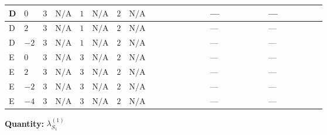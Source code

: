 \documentclass[8pt]{article}
\begin{document}
\begin{landscape}
\begin{longtable}{@{}llcccccc >{\raggedright\arraybackslash}p{0.21\linewidth} >{\raggedright\arraybackslash}p{0.21\linewidth} >{\raggedright\arraybackslash}p{0.21\linewidth}@{}}
\midrule
D & $0$ & $3$ & $\text{N/A}$ & $1$ & $\text{N/A}$ & $2$ & $\text{N/A}$ & \scriptsize\adjustbox{max width=\linewidth}{$\begin{gathered} -24 {g_2}^2 {\lambda_{S_1}^{(1)}}\end{gathered}$} & --- & --- \\
\midrule
D & $2$ & $3$ & $\text{N/A}$ & $1$ & $\text{N/A}$ & $2$ & $\text{N/A}$ & \scriptsize\adjustbox{max width=\linewidth}{$\begin{gathered} -24 {g_2}^2 {\lambda_{S_1}^{(1)}}\end{gathered}$} & --- & --- \\
\midrule
D & $-2$ & $3$ & $\text{N/A}$ & $1$ & $\text{N/A}$ & $2$ & $\text{N/A}$ & \scriptsize\adjustbox{max width=\linewidth}{$\begin{gathered} -24 {g_2}^2 {\lambda_{S_1}^{(1)}}\end{gathered}$} & --- & --- \\
\midrule
E & $0$ & $3$ & $\text{N/A}$ & $3$ & $\text{N/A}$ & $2$ & $\text{N/A}$ & \scriptsize\adjustbox{max width=\linewidth}{$\begin{gathered} -24 {g_2}^2 {\lambda_{S_1}^{(1)}}\end{gathered}$} & --- & --- \\
\midrule
E & $2$ & $3$ & $\text{N/A}$ & $3$ & $\text{N/A}$ & $2$ & $\text{N/A}$ & \scriptsize\adjustbox{max width=\linewidth}{$\begin{gathered} -24 {g_2}^2 {\lambda_{S_1}^{(1)}}\end{gathered}$} & --- & --- \\
\midrule
E & $-2$ & $3$ & $\text{N/A}$ & $3$ & $\text{N/A}$ & $2$ & $\text{N/A}$ & \scriptsize\adjustbox{max width=\linewidth}{$\begin{gathered} -24 {g_2}^2 {\lambda_{S_1}^{(1)}}\end{gathered}$} & --- & --- \\
\midrule
E & $-4$ & $3$ & $\text{N/A}$ & $3$ & $\text{N/A}$ & $2$ & $\text{N/A}$ & \scriptsize\adjustbox{max width=\linewidth}{$\begin{gathered} -24 {g_2}^2 {\lambda_{S_1}^{(1)}}\end{gathered}$} & --- & --- \\
\midrule
\bottomrule
\end{longtable}
\clearpage
\noindent\textbf{Quantity: }$\lambda_{S_1}^{(1)}$\par\smallskip

\end{landscape}
\end{document}
